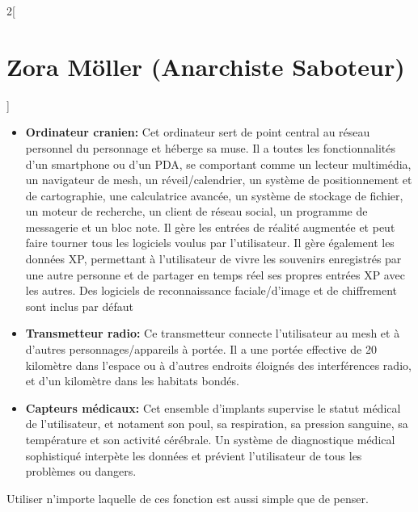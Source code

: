 \documentclass[a4paper,9pt]{article}
\begin{document}
\begin{multicols}{2}[\section*{Zora Möller (Anarchiste Saboteur)}]
\begin{itemize}
   \item \textbf{Ordinateur cranien:} Cet ordinateur sert de point central au
      réseau personnel du personnage et héberge sa muse. Il a toutes
      les fonctionnalités d'un smartphone ou d'un PDA, se comportant comme un
      lecteur multimédia, un navigateur de mesh, un réveil/calendrier, un
      système de positionnement et de cartographie, une calculatrice avancée,
      un système de stockage de fichier, un moteur de recherche, un client de
      réseau social, un programme de messagerie et un bloc note. Il gère les
      entrées de réalité augmentée et peut faire tourner tous les logiciels
      voulus par l'utilisateur. Il gère également les données XP, permettant à
      l'utilisateur de vivre les souvenirs enregistrés par une autre personne et
      de partager en temps réel ses propres entrées XP avec les autres. Des
      logiciels de reconnaissance faciale/d'image et de chiffrement
      sont inclus par défaut
   \item \textbf{Transmetteur radio:} Ce transmetteur connecte l'utilisateur au
      mesh et à d'autres personnages/appareils à portée. Il a une portée
      effective de 20 kilomètre dans l'espace ou à d'autres endroits éloignés
      des interférences radio, et d'un kilomètre dans les habitats bondés.
   \item \textbf{Capteurs médicaux:} Cet ensemble d'implants supervise le
      statut médical de l'utilisateur, et notament son poul, sa respiration, sa
      pression sanguine, sa température et son activité cérébrale. Un système de
      diagnostique médical sophistiqué interpète les données et prévient
      l'utilisateur de tous les problèmes ou dangers.
\end{itemize} 

Utiliser n'importe laquelle de ces fonction est aussi simple que de penser.


\end{multicols}
\end{document}
